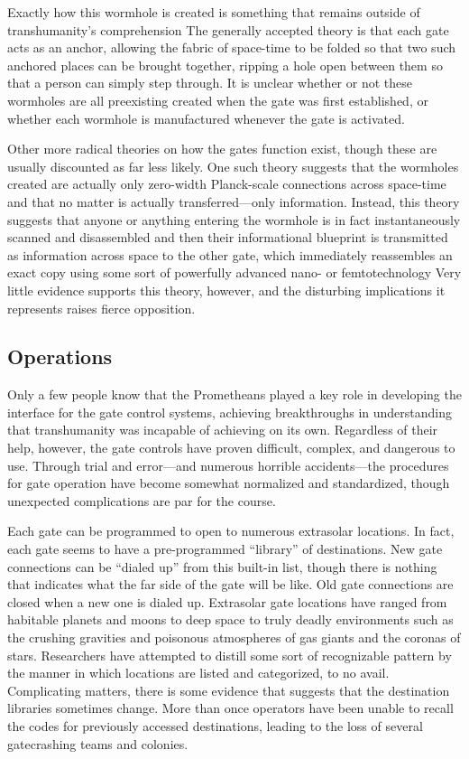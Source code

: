 Exactly how this wormhole is created is something 
that remains outside of transhumanity's comprehension
The generally accepted theory is that each gate
acts as an anchor, allowing the fabric of space-time 
to be folded so that two such anchored places can 
be brought together, ripping a hole open between 
them so that a person can simply step through. It is 
unclear whether or not these wormholes are all preexisting
created when the gate was first established,
or whether each wormhole is manufactured whenever 
the gate is activated.

Other more radical theories on how the gates function
exist, though these are usually discounted as far
less likely. One such theory suggests that the wormholes
created are actually only zero-width Planck-scale
connections across space-time and that no matter
is actually transferred—only information. Instead, this 
theory suggests that anyone or anything entering the 
wormhole is in fact instantaneously scanned and disassembled
and then their informational blueprint is
transmitted as information across space to the other 
gate, which immediately reassembles an exact copy 
using some sort of powerfully advanced nano- or femtotechnology
Very little evidence supports this theory,
however, and the disturbing implications it represents 
raises fierce opposition.

\subsection{Operations}

Only a few people know that the Prometheans played 
a key role in developing the interface for the gate control
systems, achieving breakthroughs in understanding
that transhumanity was incapable of achieving on
its own. Regardless of their help, however, the gate 
controls have proven difficult, complex, and dangerous
to use. Through trial and error—and numerous
horrible accidents—the procedures for gate operation 
have become somewhat normalized and standardized, 
though unexpected complications are par for the 
course.

Each gate can be programmed to open to numerous 
extrasolar locations. In fact, each gate seems to have 
a pre-programmed ``library'' of destinations. New 
gate connections can be ``dialed up'' from this built-in 
list, though there is nothing that indicates what the 
far side of the gate will be like. Old gate connections 
are closed when a new one is dialed up. Extrasolar 
gate locations have ranged from habitable planets 
and moons to deep space to truly deadly environments
such as the crushing gravities and poisonous
atmospheres of gas giants and the coronas of stars. 
Researchers have attempted to distill some sort of recognizable
pattern by the manner in which locations
are listed and categorized, to no avail. Complicating 
matters, there is some evidence that suggests that the 
destination libraries sometimes change. More than 
once operators have been unable to recall the codes 
for previously accessed destinations, leading to the 
loss of several gatecrashing teams and colonies.

